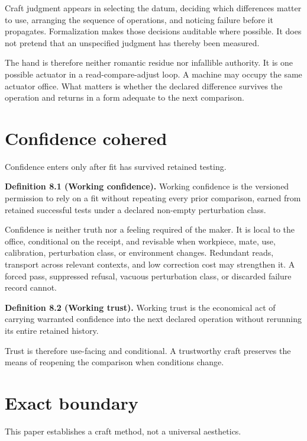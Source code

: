 \documentclass[11pt]{article}
\begin{document}
Craft judgment appears in selecting the datum, deciding which differences matter to use, arranging the sequence of operations, and noticing failure before it propagates. Formalization makes those decisions auditable where possible. It does not pretend that an unspecified judgment has thereby been measured.

The hand is therefore neither romantic residue nor infallible authority. It is one possible actuator in a read-compare-adjust loop. A machine may occupy the same actuator office. What matters is whether the declared difference survives the operation and returns in a form adequate to the next comparison.

\section{Confidence cohered}

Confidence enters only after fit has survived retained testing.

\textbf{Definition 8.1 (Working confidence).}
Working confidence is the versioned permission to rely on a fit without repeating every prior comparison, earned from retained successful tests under a declared non-empty perturbation class.

Confidence is neither truth nor a feeling required of the maker. It is local to the office, conditional on the receipt, and revisable when workpiece, mate, use, calibration, perturbation class, or environment changes. Redundant reads, transport across relevant contexts, and low correction cost may strengthen it. A forced pass, suppressed refusal, vacuous perturbation class, or discarded failure record cannot.

\textbf{Definition 8.2 (Working trust).}
Working trust is the economical act of carrying warranted confidence into the next declared operation without rerunning its entire retained history.

Trust is therefore use-facing and conditional. A trustworthy craft preserves the means of reopening the comparison when conditions change.

\section{Exact boundary}

This paper establishes a craft method, not a universal aesthetics.
\end{document}

